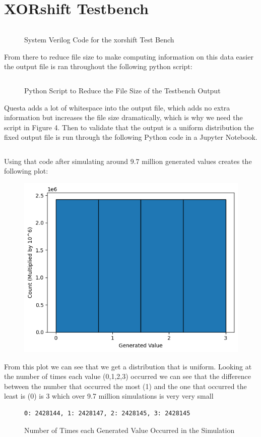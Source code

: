 \documentclass{report}
\begin{document}
\section{XORshift Testbench}
\begin{figure}[H]
    \inputminted{sv}{../xorshift_testbench.sv}
    \caption{System Verilog Code for the xorshift Test Bench}
\end{figure}
From there to reduce file size to make computing information on this data easier the output file is ran throughout the following python script:
\begin{figure}[H]
    \inputminted{python}{../output_fix.py}
    \caption{Python Script to Reduce the File Size of the Testbench Output}
\end{figure}
Questa adds a lot of whitespace into the output file, which adds no extra information but increases the file size dramatically, which is why we need the script in Figure 4. Then to validate that the output is a uniform distribution the fixed output file is run through the following Python code in a Jupyter Notebook.
\begin{figure}[H]
    \inputminted{python}{../meow.py}
\end{figure}
Using that code after simulating around 9.7 million generated values creates the following plot:
\begin{figure}[H]
    \begin{center}
        \includegraphics[scale=0.5]{images/rng_plot.png}
    \end{center}
\end{figure}
From this plot we can see that we get a distribution that is uniform. Looking at the number of times each value (0,1,2,3) occurred we can see that the difference between the number that occurred the most (1) and the one that occurred the least is (0) is 3 which over 9.7 million simulations is very very small
\begin{figure}[H]
    \begin{Verbatim}[frame=single]
0: 2428144, 1: 2428147, 2: 2428145, 3: 2428145
    \end{Verbatim}
    \caption{Number of Times each Generated Value Occurred in the Simulation}
\end{figure}
 \newpage
\end{document}
